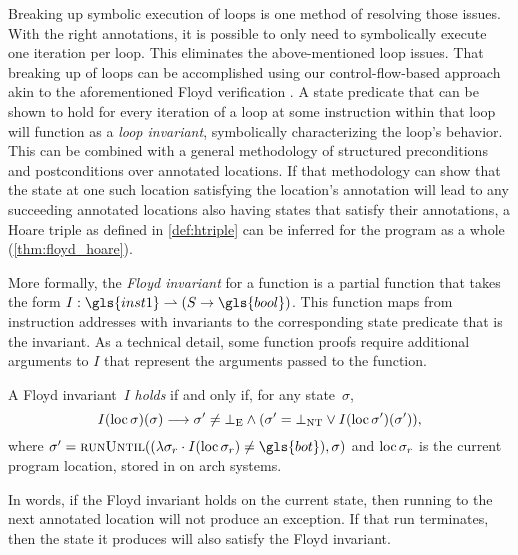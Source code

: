 Breaking up symbolic execution of loops is one method of resolving those issues.
With the right annotations,
it is possible to only need to symbolically execute one iteration per loop.
This eliminates the above-mentioned loop issues.
That breaking up of loops can be accomplished using our control-flow-based approach
akin to the aforementioned Floyd verification \autocite{floyd1967assigning}.%
A state predicate that can be shown to hold for every iteration of a loop
at some instruction within that loop will function as a \emph{loop invariant},%
symbolically characterizing the loop's behavior.
This can be combined with a general methodology of structured preconditions and postconditions over annotated locations.
If that methodology can show that the state at one such location
satisfying the location's annotation will lead to any succeeding annotated locations
also having states that satisfy their annotations,
a Hoare triple as defined in \cref{def:htriple}
can be inferred for the program as a whole (\cref{thm:floyd_hoare}).

More formally, the \emph{Floyd invariant}%
for a function is a partial function that takes the form
$I:\gls{inst1}\rightharpoonup(S\rightarrow\gls{bool})$.
This function maps from instruction addresses with invariants
to the corresponding state predicate that is the invariant.
As a technical detail, some function proofs require additional arguments to $I$
that represent the arguments passed to the function.
\begin{definition}\label{def:floyd_inv}
  A Floyd invariant~$I$ \emph{holds} if and only if, for any state~$\sigma$,
  \begin{equation}
    I(\operatorname{loc}\sigma)(\sigma)\longrightarrow
    \sigma'\neq\bot_\mathrm{E}\land(\sigma'=\bot_\mathrm{NT}\lor I(\operatorname{loc}\sigma')(\sigma')),
  \end{equation}
  where
  $\sigma'=\run((\lambda\sigma_r\cdot I(\loc\sigma_r)\neq\gls{bot}),\sigma)$%
  and $\operatorname{loc}\sigma_r$ is the current program location,
  stored in  on \gls{arch} systems.
\end{definition}
In words, if the Floyd invariant holds on the current state,
then running to the next annotated location will not produce an exception.
If that run terminates, then the state it produces
will also satisfy the Floyd invariant.

